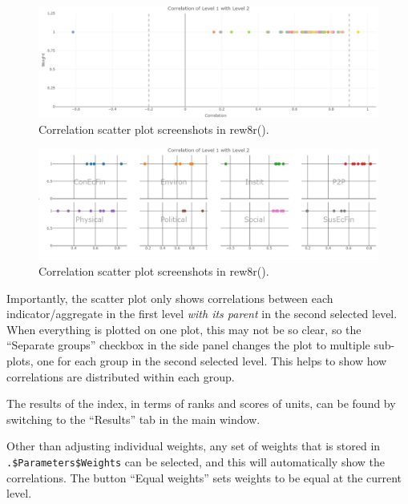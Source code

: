 \documentclass[
]{book}
\begin{document}
\begin{figure}

{\centering \includegraphics[width=1\linewidth]{images/corr_scat_screenshot_rew8r} 

}

\caption{Correlation scatter plot screenshots in rew8r().}\label{fig:unnamed-chunk-71-1}
\end{figure}
\begin{figure}

{\centering \includegraphics[width=1\linewidth]{images/corr_scat_sep_screenshot_rew8r} 

}

\caption{Correlation scatter plot screenshots in rew8r().}\label{fig:unnamed-chunk-71-2}
\end{figure}

Importantly, the scatter plot only shows correlations between each indicator/aggregate in the first level \emph{with its parent} in the second selected level. When everything is plotted on one plot, this may not be so clear, so the ``Separate groups'' checkbox in the side panel changes the plot to multiple sub-plots, one for each group in the second selected level. This helps to show how correlations are distributed within each group.

The results of the index, in terms of ranks and scores of units, can be found by switching to the ``Results'' tab in the main window.

Other than adjusting individual weights, any set of weights that is stored in \texttt{.\$Parameters\$Weights} can be selected, and this will automatically show the correlations. The button ``Equal weights'' sets weights to be equal at the current level.
\end{document}
